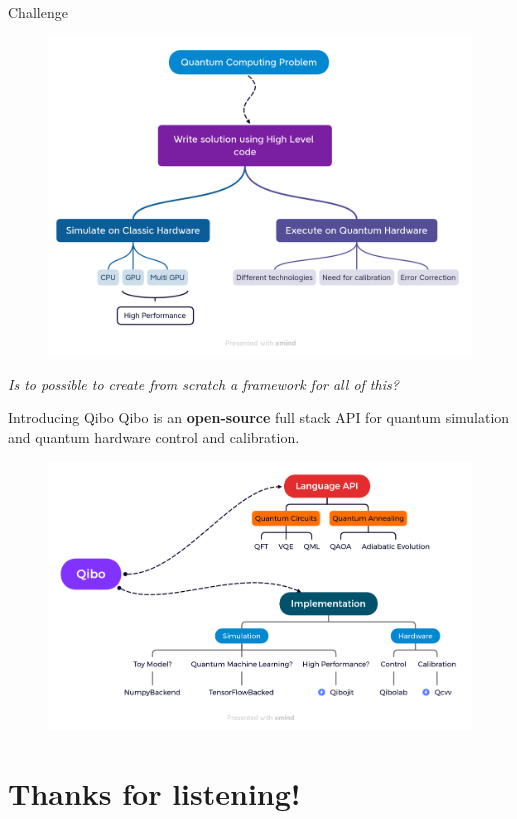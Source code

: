 \documentclass[11p,aspectratio=169]{beamer}
\begin{document}
    \begin{frame}{Challenge}
        \begin{figure}
            \includegraphics[width=\textwidth]{figures/intro.png}
        \end{figure}
        \centering
        \emph{Is to possible to create from scratch a framework for all of this?}
    \end{frame}


\begin{frame}{Introducing Qibo}
    Qibo is an \textbf{open-source} full stack API for quantum simulation and quantum hardware control and calibration.
    \begin{figure}
        \includegraphics[width= \textwidth]{figures/Qibo.png}
    \end{figure}
\end{frame}

\section*{Thanks for listening!}
\end{document}
